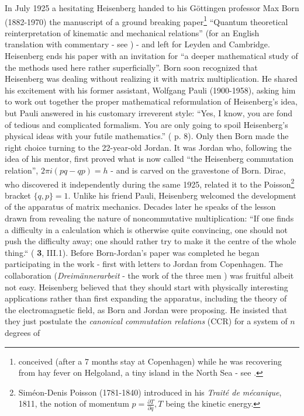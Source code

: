  In July 1925 a hesitating Heisenberg handed to his G\"ottingen professor Max
Born (1882-1970) the manuscript of a ground breaking paper\footnote{conceived
(after a 7 months stay at Copenhagen) while he was recovering from hay fever on
Helgoland, a tiny island in the North Sea - see \cite{T05}.}  ``Quantum
theoretical reinterpretation of kinematic and mechanical relations'' (for an
English translation with commentary - see \cite{SQM}) - and left for
Leyden and Cambridge. Heisenberg ends his paper with an invitation for ``a
deeper mathematical study of the methods used here rather superficially''. Born
 soon recognized that Heisenberg was dealing without realizing it with matrix
multiplication. He shared his excitement with his former assistant, Wolfgang
Pauli (1900-1958), asking him to work out together the proper mathematical
reformulation of Heisenberg's idea, but Pauli answered in his customary
irreverent style: ``Yes, I know, you are fond
of tedious and complicated formalism. You are only going to spoil Heisenberg's
physical ideas with your futile mathematics.'' (\cite{Sch} p. 8). Only then Born
 made the right choice turning to the 22-year-old Jordan. It was Jordan who,
following the idea of his mentor, first proved what is now called ``the
Heisenberg commutation
relation'', $2\pi i (pq - qp) = h$ - and is carved on the gravestone of Born.
 Dirac, who discovered it independently during the same 1925, related it to the
 Poisson\footnote{Sim\'eon-Denis Poisson (1781-1840) introduced in his {\it 
Trait\'e de m\'ecanique}, 1811, the notion of momentum $p = \frac{\partial T}
{\partial {\dot q}}, T$ being the kinetic energy.} bracket $\{q,p\} = 1$. 
Unlike his friend Pauli, Heisenberg welcomed the development of the apparatus of 
matrix mechanics. Decades later he speaks of the lesson drawn from revealing 
the nature of noncommutative multiplication: ``If one finds a difficulty in a 
calculation which is otherwise quite convincing,
one should not push the difficulty away; one should rather try to make it the
centre of the whole thing.``  (\cite{MR} {\bf 3}, III.1). Before Born-Jordan's
paper was completed he began participating in the work - first with letters to
Jordan from Copenhagen. The collaboration ({\it Dreim\"annerarbeit} - the work
of the three men \cite{BHJ}) was fruitful albeit not easy. Heisenberg believed
that they should start with physically interesting applications rather than
first expanding the apparatus, including the theory of the electromagnetic
field, as Born and Jordan were proposing. He insisted that they just postulate
the {\it canonical commutation relations} (CCR) for a system of $n$ degrees of

